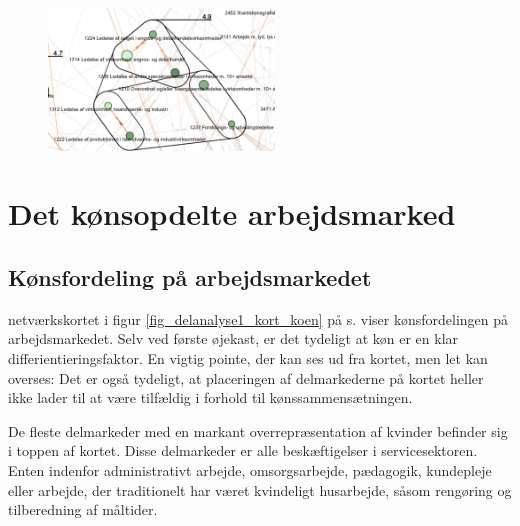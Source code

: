%
\begin{figure}
  \vspace{-20pt}
  \begin{center}
    \includegraphics[width=6cm]{fig/segzoom/seg_4_9_timeloen.pdf}
   \caption{}
   \label{fig_delanalyse1_zoom_4_9}
  \end{center}
  \vspace{-20pt}
\end{figure}
%




\section{Det kønsopdelte arbejdsmarked \label{sec_delanalyse2 koensfordeling generelt}}







%
\subsection{Kønsfordeling på arbejdsmarkedet}
%


netværkskortet i figur \ref{fig_delanalyse1_kort_koen} på s. \pageref{fig_delanalyse1_kort_koen} viser kønsfordelingen på arbejdsmarkedet. Selv ved første øjekast, er det tydeligt at køn er en klar differientieringsfaktor. 
En vigtig pointe, der kan ses ud fra kortet, men let kan overses: Det er også tydeligt, at placeringen af delmarkederne på kortet heller ikke lader til at være tilfældig i forhold til kønssammensætningen. 

De fleste delmarkeder med en markant overrepræsentation af kvinder befinder sig i toppen af kortet. Disse delmarkeder er alle beskæftigelser i servicesektoren. Enten indenfor administrativt arbejde, omsorgsarbejde, pædagogik, kundepleje eller arbejde, der traditionelt har været kvindeligt husarbejde, såsom rengøring og tilberedning af måltider.  

